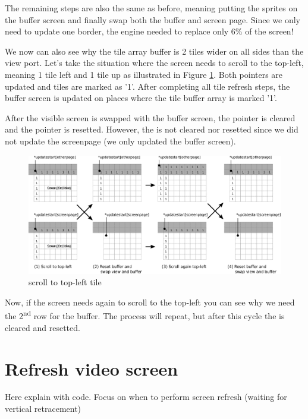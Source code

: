 \documentclass[book.tex]{subfiles}
\begin{document}
The remaining steps are also the same as before, meaning putting the sprites on the buffer screen and finally swap both the buffer and screen page. Since we only need to update one border, the engine needed to replace only 6\% of the screen!\\

\par

We now can also see why the tile array buffer is 2 tiles wider on all sides than the view port. Let's take the situation where the screen needs to scroll to the top-left, meaning 1 tile left and 1 tile up as illustrated in Figure \ref{fig:buffer_tile_move_1}. Both  pointers are updated and tiles are marked as '1'. After completing all tile refresh steps, the buffer screen is updated on places where the tile buffer array is marked '1'. \\
\par
After the visible screen is swapped with the buffer screen, the  pointer is cleared and the pointer is resetted. However, the  is not cleared nor resetted since we did not update the screenpage (we only updated the buffer screen).\\
\begin{figure}[H]
  \centering
  \includegraphics[width=\textwidth]{imgs/drawings/buffer_tile_move.eps}
  \caption{scroll to top-left tile}
  \label{fig:buffer_tile_move_1}
\end{figure}
Now, if the screen needs again to scroll to the top-left you can see why we need the 2\textsuperscript{nd} row for the buffer. The process will repeat, but after this cycle the  is cleared and resetted.\\
\pagebreak





\section{Refresh video screen}
Here explain with code. Focus on when to perform screen refresh (waiting for vertical retracement)
\end{document}
